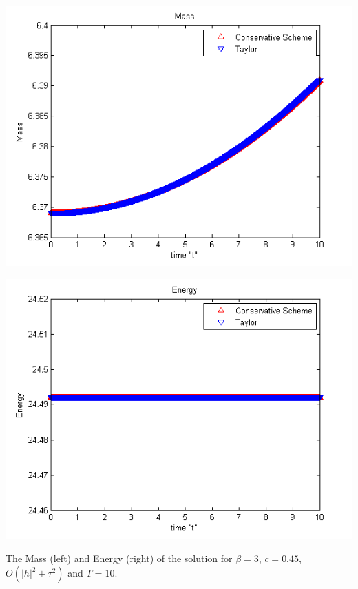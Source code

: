 \documentclass[%
 aip,
cp,  %
 amsmath,amssymb,%
 reprint,%
]{revtex4-2}
\begin{document}
\begin{center}\vspace{0.4cm}
	\begin{minipage}[b]{0.49\linewidth}
		 \includegraphics[width=\linewidth]{figures/Mass_bt3_c045_h005.png}
	\end{minipage}	
	\begin{minipage}[b]{0.49\linewidth}
		\includegraphics[width=\linewidth]{figures/Energy_bt3_c045_h005.png}
		
	\end{minipage}
\end{center}
The Mass (left) and Energy (right) of the solution for $\beta=3$, $c = 0.45$, $O(|h|^2 + \tau^2)$ and $T = 10$.
\end{document}
